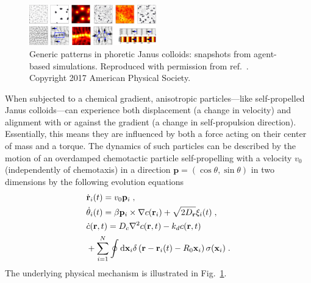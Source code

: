 \documentclass[a4paper, amsfonts, amssymb, amsmath, reprint, showkeys, showpacs, nofootinbib, twoside]{revtex4-2}
\begin{document}
\begin{figure}
    \includegraphics[width=0.49\textwidth]{./figs/chemoBehaviors1.png}
    \caption{
        \label{fig:chemoBehaviors1} Generic patterns in phoretic Janus colloids: snapshots from agent-based simulations.
        Reproduced with permission from ref.~\cite{PhysRevLett.118.268001}. Copyright 2017 American Physical Society.
    }
\end{figure}

When subjected to a chemical gradient, anisotropic particles—like self-propelled Janus colloids—can experience both displacement (a change in velocity) and alignment with or against the gradient (a change in self-propulsion direction). Essentially, this means they are influenced by both a force acting on their center of mass and a torque. The dynamics of such particles can be described by the motion of an overdamped chemotactic particle self-propelling with a velocity $v_0$ (independently of chemotaxis) in a direction $\mathbf{p}=\left(\cos\theta, \sin\theta\right)$ in two dimensions by the following evolution equations \cite{PhysRevLett.118.268001}
\begin{subequations}
    \label{eq:JanusChemotaxis}
    \begin{align}
        &\dot{\mathbf{r}}_i(t)=v_0\mathbf{p}_i\;,\\
        &\dot{\theta}_i(t)=\beta \mathbf{p}_i\times \nabla c(\mathbf{r}_i)+\sqrt{2D_{\mathbf{r}}}\xi _i(t)\;,\\
        &\dot{c}(\mathbf{r},t)=D_c\nabla ^2c(\mathbf{r},t)-k_dc(\mathbf{r},t)\notag\\
        &+\sum_{i=1}^N{\oint{\mathrm{d}\mathbf{x}_i\delta \left(\mathbf{r}-\mathbf{r}_i(t)-R_0\mathbf{x}_i\right)\sigma (\mathbf{x}_i)}}\;.
    \end{align}
\end{subequations}
The underlying physical mechanism is illustrated in Fig.~\ref{fig:chemoBehaviors1}. 
\end{document}
